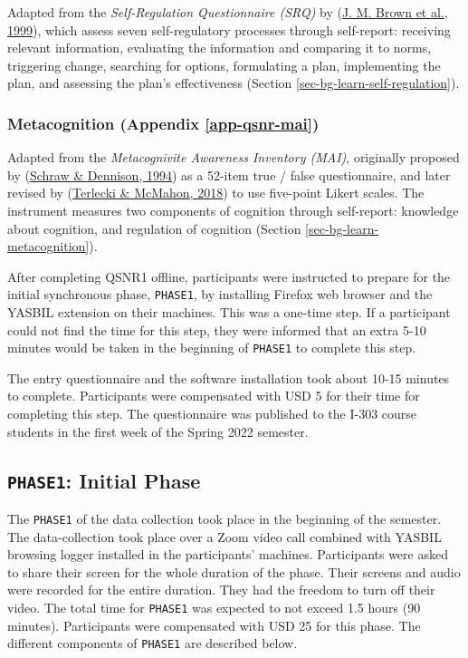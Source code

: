 \documentclass[letterpaper, nobind]{templates/ociamthesis}
\begin{document}
Adapted from the \emph{Self-Regulation Questionnaire (SRQ)} by
(\protect\hyperlink{ref-brown1999self}{J. M. Brown et al., 1999}), which assess seven self-regulatory processes
through self-report: receiving relevant information, evaluating the
information and comparing it to norms, triggering change, searching
for options, formulating a plan, implementing the plan, and
assessing the plan's effectiveness (Section \ref{sec-bg-learn-self-regulation}).

\hypertarget{metacognition-appendix-refapp-qsnr-mai}{%
\subsubsection{Metacognition (Appendix \ref{app-qsnr-mai})}\label{metacognition-appendix-refapp-qsnr-mai}}

Adapted from the \emph{Metacognivite Awareness Inventory (MAI)},
originally proposed by (\protect\hyperlink{ref-schraw1994assessing}{Schraw \& Dennison, 1994}) as a 52-item true /
false questionnaire, and later revised by (\protect\hyperlink{ref-terlecki2018call}{Terlecki \& McMahon, 2018}) to use
five-point Likert scales. The instrument measures two components of
cognition through self-report: knowledge about cognition, and
regulation of cognition (Section \ref{sec-bg-learn-metacognition}).

After completing QSNR1 offline, participants were instructed to prepare
for the initial synchronous phase, \texttt{PHASE1}, by
installing Firefox web browser and the YASBIL extension on their machines.
This was a one-time step.
If a
participant could not find the time for this step, they were informed
that an extra 5-10 minutes would be taken in the beginning of \texttt{PHASE1} to
complete this step.

The entry questionnaire and the software installation took about
10-15 minutes to complete. Participants were compensated with USD 5
for their time for completing this step. The questionnaire was published to the I-303 course students in
the first week of the Spring 2022 semester.

\hypertarget{sec-method-phase1}{%
\subsection{\texorpdfstring{\texttt{PHASE1}: Initial Phase}{PHASE1: Initial Phase}}\label{sec-method-phase1}}

The \texttt{PHASE1} of the data collection took place in the beginning of the semester.
The data-collection took place over a Zoom video call combined with YASBIL browsing logger installed in the participants' machines.
Participants were asked to share their screen for the whole duration of the phase.
Their screens and audio were recorded for the entire duration.
They had the freedom to turn off their video.
The total time for \texttt{PHASE1} was expected to not exceed 1.5 hours (90 minutes).
Participants were compensated with USD 25 for this phase.
The different components of \texttt{PHASE1} are described below.
\end{document}

